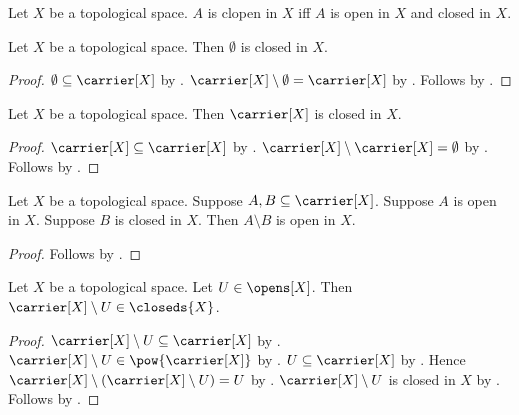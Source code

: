 \begin{definition}\label{is_clopen_in}
    Let $X$ be a topological space.
    $A$ is clopen in $X$ iff $A$ is open in $X$ and closed in $X$.
\end{definition}

\begin{proposition}\label{emptyset_is_closed}
    Let $X$ be a topological space.
    Then $\emptyset$ is closed in $X$.
\end{proposition}
\begin{proof}
    $\emptyset\subseteq\carrier[X]$ by .
    $\carrier[X]\setminus \emptyset = \carrier[X]$ by .
    Follows by .
\end{proof}

\begin{proposition}\label{carrier_is_closed}
    Let $X$ be a topological space.
    Then $\carrier[X]$ is closed in $X$.
\end{proposition}
\begin{proof}
    $\carrier[X]\subseteq\carrier[X]$ by .
    $\carrier[X]\setminus \carrier[X] = \emptyset$ by .
    Follows by
        .
\end{proof}

\begin{proposition}\label{opens_minus_closed_is_open}
    Let $X$ be a topological space.
    Suppose $A, B \subseteq \carrier[X]$.
    Suppose $A$ is open in $X$.
    Suppose $B$ is closed in $X$.
    Then $A \setminus B$ is open in $X$.
\end{proposition}
\begin{proof}
    Follows by .
\end{proof}

\begin{proposition}\label{complement_of_open_elem_closeds}
    Let $X$ be a topological space.
    Let $U\in\opens[X]$.
    Then $\carrier[X]\setminus U\in\closeds{X}$.
\end{proposition}
\begin{proof}
    $\carrier[X]\setminus U\subseteq\carrier[X]$
        by .
    $\carrier[X]\setminus U\in\pow{\carrier[X]}$
        by .
    $U\subseteq\carrier[X]$ by .
    Hence $\carrier[X]\setminus(\carrier[X]\setminus U) = U$ by .
    $\carrier[X]\setminus U$ is closed in $X$
        by .
    Follows by .
\end{proof}


